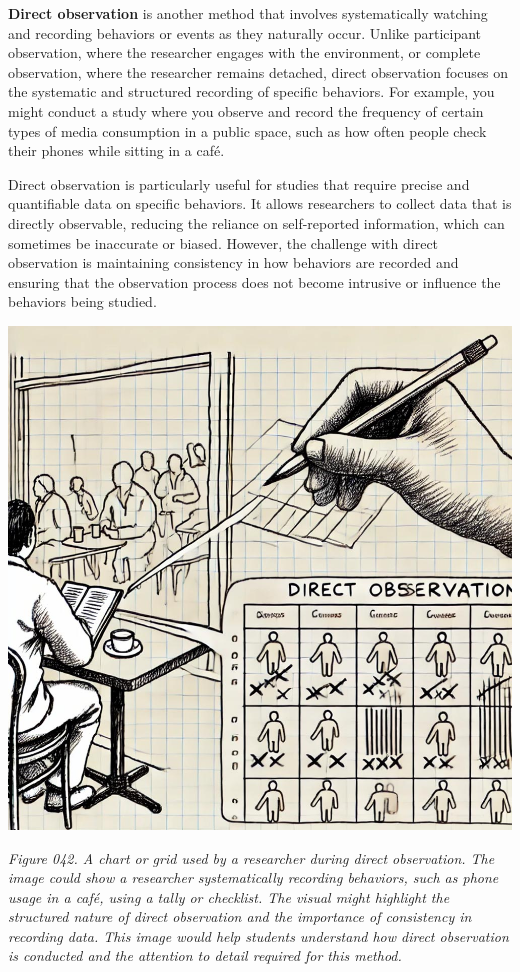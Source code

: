 \documentclass[
]{book}
\begin{document}
\textbf{Direct observation} is another method that involves systematically watching and recording behaviors or events as they naturally occur. Unlike participant observation, where the researcher engages with the environment, or complete observation, where the researcher remains detached, direct observation focuses on the systematic and structured recording of specific behaviors. For example, you might conduct a study where you observe and record the frequency of certain types of media consumption in a public space, such as how often people check their phones while sitting in a café.

Direct observation is particularly useful for studies that require precise and quantifiable data on specific behaviors. It allows researchers to collect data that is directly observable, reducing the reliance on self-reported information, which can sometimes be inaccurate or biased. However, the challenge with direct observation is maintaining consistency in how behaviors are recorded and ensuring that the observation process does not become intrusive or influence the behaviors being studied.

\includegraphics[width=1\linewidth,height=\textheight,keepaspectratio]{images/fig042.jpg}

\emph{Figure 042. A chart or grid used by a researcher during direct observation. The image could show a researcher systematically recording behaviors, such as phone usage in a café, using a tally or checklist. The visual might highlight the structured nature of direct observation and the importance of consistency in recording data. This image would help students understand how direct observation is conducted and the attention to detail required for this method.}
\end{document}
